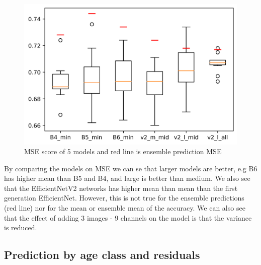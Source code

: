 \documentclass[10pt,letterpaper]{article}
\begin{document}
\begin{figure}[h!]
  \centering
  \begin{minipage}[b]{0.49\textwidth}
  \includegraphics[scale=0.2]{results/box_plot_models_acc.png}
    \caption{MSE score of 5 models and red line is ensemble prediction MSE}
   \label{marker5}
  \end{minipage}
  \hfill
\end{figure}

By comparing the models on MSE we can se that larger models are better, e.g B6 has 
higher mean than B5 and B4, and large is better than medium. 
We also see that the EfficientNetV2 networks has higher mean than mean than the
first generation EfficientNet. However, this is not true for the ensemble
predictions (red line) nor for the mean or ensemble mean of the accuracy.
We can also see that the effect of adding 3 images - 9 channels on the
model is that the variance is reduced.

\subsection*{Prediction by age class and residuals}
\end{document}
